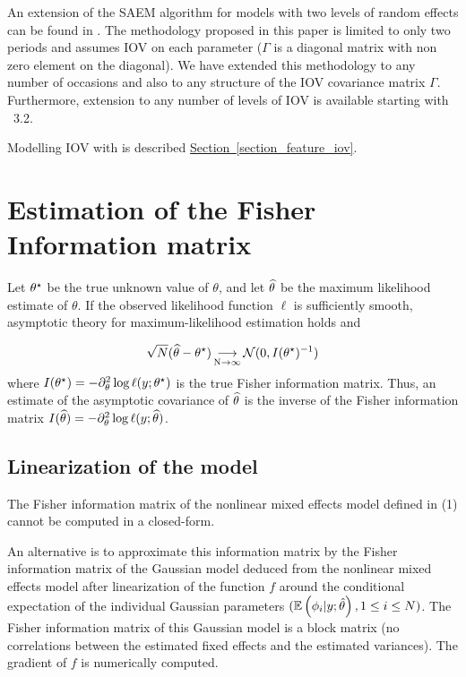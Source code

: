 An extension of the SAEM algorithm for models with two levels of
random effects can be found in \cite{PS08}. The methodology proposed
in this paper is limited to only two periods and assumes IOV on each
parameter ($\Gamma$ is a diagonal matrix with non zero element on
the diagonal). We have extended this methodology to any number of
occasions and also to any structure of the IOV covariance matrix
$\Gamma$. Furthermore, extension to any number of levels of IOV is available starting with \monolix~3.2.

Modelling IOV with \monolix is described \hyperref[section_feature_iov]{Section~\ref*{section_feature_iov}}.


\section{Estimation of the Fisher Information matrix} \label{sec_fish} Let ${\theta^\star}$ be the true unknown value of $\theta$, and let ${\widehat{\theta}}$ be the
maximum likelihood estimate of $\theta$. If the observed likelihood function $\ell$ is sufficiently smooth, asymptotic theory for maximum-likelihood
estimation holds and

\begin{equation}
\sqrt{N}({\widehat{\theta}}-{\theta^\star}) \mathop{\longrightarrow}\limits_{\mathrm{N\to \infty}}^{\mathrm{}} {\mathcal N}(0,I({\theta^\star})^{-1})
\end{equation}
where $I({\theta^\star})=- \partial^2_\theta \log \ell(y;{\theta^\star})$ is the true Fisher information matrix. Thus, an
estimate of the asymptotic covariance of ${\widehat{\theta}}$ is the  inverse of the Fisher
information matrix $I({\widehat{\theta}})=- \partial^2_\theta \log \ell(y;{\widehat{\theta}})$.


\subsection{Linearization of the model}
The Fisher information matrix of the nonlinear mixed effects model defined in (1) cannot be computed in a closed-form.

An alternative is  to approximate this information matrix  by the Fisher information matrix of the Gaussian model deduced from the nonlinear mixed
effects model after linearization of the function $f$ around the conditional expectation of the individual Gaussian parameters $(\mathbb{E}\left(\phi_{i}|y;\hat{\theta}\right), 1\leq
i \leq N) $. The Fisher information matrix of this Gaussian model is a block matrix (no correlations between the estimated fixed effects and the
estimated variances). The gradient of $f$ is numerically computed.

